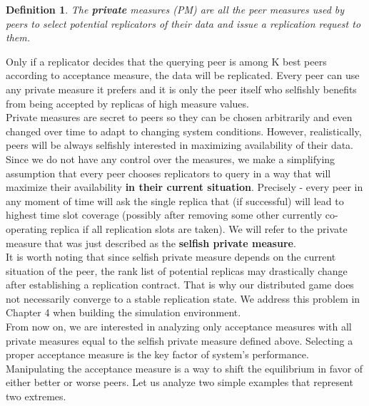 \documentclass{pracamgren}
\newcounter{collective_ctr} \numberwithin{collective_ctr}{chapter}
\newtheorem{definition}[collective_ctr]{Definition}
\begin{document}
\begin{definition}
The {\bf private} measures (PM) are all the peer measures used by peers to select potential replicators of their data and issue a replication request to them.
\end{definition}

Only if a replicator decides that the querying peer is among K best peers according to acceptance measure, the data will be replicated. Every peer can use any private measure it prefers and it is only the peer itself who selfishly benefits from being accepted by replicas of high measure values.\\

Private measures are secret to peers so they can be chosen arbitrarily and even changed over time to adapt to changing system conditions. However, realistically, peers will be always selfishly interested in maximizing availability of their data. Since we do not have any control over the measures, we make a simplifying assumption that every peer chooses replicators to query in a way that will maximize their availability {\bf in their current situation}. Precisely - every peer in any moment of time will ask the single replica that (if successful) will lead to highest time slot coverage (possibly after removing some other currently co-operating replica if all replication slots are taken). We will refer to the private measure that was just described as the {\bf selfish private measure}.\\

It is worth noting that since selfish private measure depends on the current situation of the peer, the rank list of potential replicas may drastically change after establishing a replication contract. That is why our distributed game does not necessarily converge to a stable replication state. We address this problem in Chapter 4 when building the simulation environment.\\

From now on, we are interested in analyzing only acceptance measures with all private measures equal to the selfish private measure defined above. Selecting a proper acceptance measure is the key factor of system's performance. Manipulating the acceptance measure is a way to shift the equilibrium in favor of either better or worse peers. Let us analyze two simple examples that represent two extremes.\\

\end{document}
